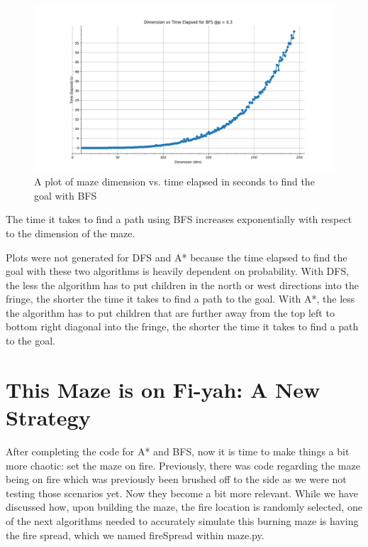 \documentclass[11pt]{article}
\begin{document}
\begin{figure}[h]
\centering
\includegraphics[scale=0.5]{dimVStimeBFS_MAX243.PNG}
\caption{A plot of maze dimension vs. time elapsed in seconds to find the goal with BFS}
\label{BFStime}
\end{figure}
The time it takes to find a path using BFS increases exponentially with respect to the dimension of the maze.

Plots were not generated for DFS and A* because the time elapsed to find the goal with these two algorithms is heavily dependent on probability. With DFS, the less the algorithm has to put children in the north or west directions into the fringe, the shorter the time it takes to find a path to the goal. With A*, the less the algorithm has to put children that are further away from the top left to bottom right diagonal into the fringe, the shorter the time it takes to find a path to the goal.
	\pagebreak
\section{This Maze is on Fi-yah: A New Strategy}
After completing the code for A* and BFS, now it is time to make things a bit more chaotic: set the maze on fire. Previously, there was code regarding the maze being on fire which was previously been brushed off to the side as we were not testing those scenarios yet. Now they become a bit more relevant.
While we have discussed how, upon building the maze, the fire location is randomly selected, one of the next algorithms needed to accurately simulate this burning maze is having the fire spread, which we named fireSpread within maze.py.
\end{document}
